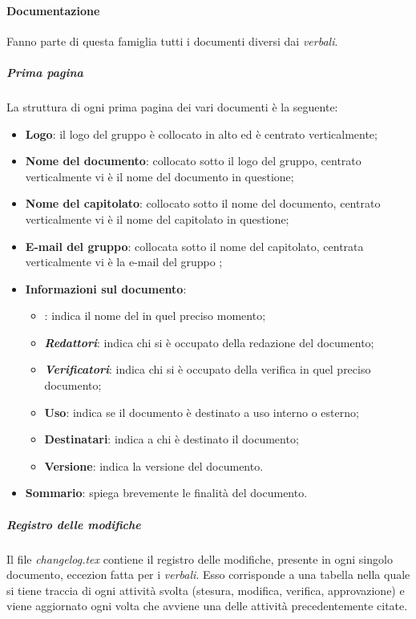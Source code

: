 \paragraph{Documentazione}
Fanno parte di questa famiglia tutti i documenti diversi dai \textit{verbali}.
\subparagraph{Prima pagina}
La struttura di ogni prima pagina dei vari documenti è la seguente:
\begin {itemize}
\item \textbf{Logo}: il logo del gruppo \groupName{} è collocato in alto ed è centrato verticalmente;
\item \textbf{Nome del documento}: collocato sotto il logo del gruppo, centrato verticalmente vi è il nome del documento in questione;
\item \textbf{Nome del capitolato}: collocato sotto il nome del documento, centrato verticalmente vi è il nome del capitolato in questione;
\item \textbf{E-mail del gruppo}: collocata sotto il nome del capitolato, centrata verticalmente vi è la e-mail del gruppo \groupName{};
\item \textbf{Informazioni sul documento}:
\begin{itemize}
    \item \textbf{\roleProjectManager}: indica il nome del \roleProjectManagerLow{} in quel preciso momento;
    \item \textbf{\textit{Redattori}}: indica chi si è occupato della redazione del documento;
    \item \textbf{\textit{Verificatori}}: indica chi si è occupato della verifica in quel preciso documento;
    \item \textbf{Uso}: indica se il documento è destinato a uso interno o esterno;
    \item \textbf{Destinatari}: indica a chi è destinato il documento;
    \item \textbf{Versione}: indica la versione del documento.
\end{itemize}
\item \textbf{Sommario}: spiega brevemente le finalità del documento.
\end {itemize}
\subparagraph{Registro delle modifiche}\label{subparagraph:registro_modifiche}
Il file \textit{changelog.tex} contiene il registro delle modifiche, presente in ogni singolo documento, eccezion fatta per i \textit{verbali}.
Esso corrisponde a una tabella nella quale si tiene traccia di ogni attività svolta (stesura, modifica, verifica, approvazione) e viene aggiornato ogni volta che avviene una delle attività precedentemente citate.
